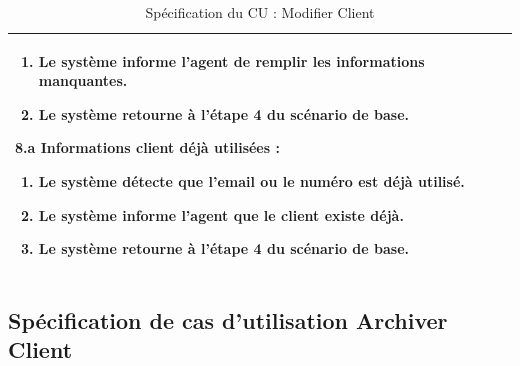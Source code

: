 \begin{table}[H]
\begin{tabularx}{\textwidth}{|p{3.4cm}|X|}
\begin{enumerate}[leftmargin=1.5em, topsep=1pt, itemsep=0pt]
  \item Le système informe l'agent de remplir les informations manquantes.
  \item Le système retourne à l'étape 4 du scénario de base.
\end{enumerate}
\textbf{8.a Informations client déjà utilisées :}
\begin{enumerate}[leftmargin=1.5em, topsep=1pt, itemsep=0pt]
  \item Le système détecte que l'email ou le numéro est déjà utilisé.
  \item Le système informe l'agent que le client existe déjà.
  \item Le système retourne à l'étape 4 du scénario de base.
\end{enumerate} \\
\hline
\end{tabularx}
\caption{Spécification du CU : Modifier Client}
\label{tab:cu-modifier-client}
\end{table}
\subsection{Spécification de cas d'utilisation Archiver Client}

